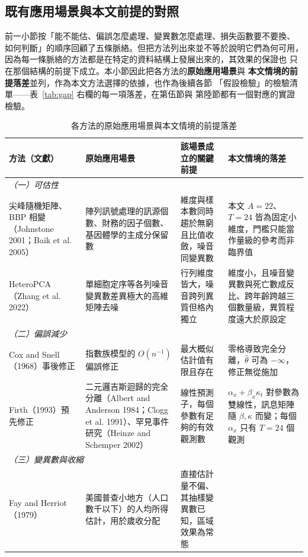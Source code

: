 \documentclass[UTF8, fontset=macnew, a4paper, 12pt]{ctexart}
\begin{document}
\subsection{既有應用場景與本文前提的對照}\label{sec:gap}

前一小節按「能不能估、偏誤怎麼處理、變異數怎麼處理、損失函數要不要換、
如何判斷」的順序回顧了五條脈絡。但把方法列出來並不等於說明它們為何可用，
因為每一條脈絡的方法都是在特定的資料結構上發展出來的，其效果的保證也
只在那個結構的前提下成立。本小節因此把各方法的\textbf{原始應用場景}與
\textbf{本文情境的前提落差}並列，作為本文方法選擇的依據，也作為後續各節
「假設檢驗」的檢驗清單——表~\ref{tab:gap} 右欄的每一項落差，在第伍節與
第陸節都有一個對應的實證檢驗。

\begin{table}[H]
\centering
\caption{各方法的原始應用場景與本文情境的前提落差}
\footnotesize
\renewcommand{\arraystretch}{1.25}
\begin{tabular}{p{2.5cm}p{3.6cm}p{3.7cm}p{4.3cm}}
\toprule
方法（文獻） & 原始應用場景 & 該場景成立的關鍵前提 & 本文情境的落差\\
\midrule
\multicolumn{4}{l}{\textit{（一）可估性}}\\
尖峰隨機矩陣、BBP 相變（Johnstone 2001；Baik et al. 2005） &
陣列訊號處理的訊源個數、財務的因子個數、基因體學的主成分保留數 &
維度與樣本數同時趨於無窮且比值收斂，噪音同變異數 &
本文 $A=22$、$T=24$ 皆為固定小維度，門檻只能當作量級的參考而非臨界值\\
HeteroPCA（Zhang et al. 2022） &
單細胞定序等各列噪音變異數差異極大的高維矩陣去噪 &
行列維度皆大，噪音跨列異質但格內獨立 &
維度小，且噪音變異數與死亡數成反比、跨年齡跨越三個數量級，異質程度遠大於原設定\\
\midrule
\multicolumn{4}{l}{\textit{（二）偏誤減少}}\\
Cox and Snell（1968）事後修正 &
指數族模型的 $O(n^{-1})$ 偏誤修正 &
最大概似估計值有限且存在 &
零格導致完全分離，$\hat\theta$ 可為 $-\infty$，修正無從施加\\
Firth（1993）預先修正 &
二元邏吉斯迴歸的完全分離（Albert and Anderson 1984；Clogg et al. 1991）、罕見事件研究（Heinze and Schemper 2002） &
線性預測子，每個參數有足夠的有效觀測數 &
$\alpha_x+\beta_x\kappa_t$ 對參數為雙線性，訊息矩陣隨 $\beta,\kappa$ 而變；每個 $\alpha_x$ 只有 $T=24$ 個觀測\\
\midrule
\multicolumn{4}{l}{\textit{（三）變異數與收縮}}\\
Fay and Herriot（1979） &
美國普查小地方（人口數千以下）的人均所得估計，用於歲收分配 &
直接估計量不偏、其抽樣變異數已知，區域效果為常態 &

\end{tabular}
\end{table}
\end{document}
